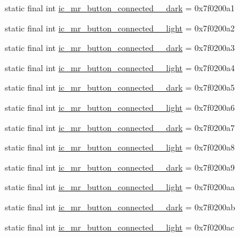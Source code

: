 \begin{CompactItemize}
\item 
static final int \hyperlink{classandroid_1_1support_1_1v7_1_1cardview_1_1_r_1_1drawable_36d4e7c06bec15ad7ebc860745ea773f}{ic\_\-mr\_\-button\_\-connected\_\_\-dark} = 0x7f0200a1
\item 
static final int \hyperlink{classandroid_1_1support_1_1v7_1_1cardview_1_1_r_1_1drawable_4e21ccc89b4e22bce84a042269f22503}{ic\_\-mr\_\-button\_\-connected\_\_\-light} = 0x7f0200a2
\item 
static final int \hyperlink{classandroid_1_1support_1_1v7_1_1cardview_1_1_r_1_1drawable_dae10b2248cdcb9e21725f2cdd05a508}{ic\_\-mr\_\-button\_\-connected\_\_\-dark} = 0x7f0200a3
\item 
static final int \hyperlink{classandroid_1_1support_1_1v7_1_1cardview_1_1_r_1_1drawable_91321fddb48432cad9e726a84f8b4fc0}{ic\_\-mr\_\-button\_\-connected\_\_\-light} = 0x7f0200a4
\item 
static final int \hyperlink{classandroid_1_1support_1_1v7_1_1cardview_1_1_r_1_1drawable_060ca2096b7bc826d40b7af7c21f631e}{ic\_\-mr\_\-button\_\-connected\_\_\-dark} = 0x7f0200a5
\item 
static final int \hyperlink{classandroid_1_1support_1_1v7_1_1cardview_1_1_r_1_1drawable_43e0c6d5ca18bd80a29a3fdca85ee1de}{ic\_\-mr\_\-button\_\-connected\_\_\-light} = 0x7f0200a6
\item 
static final int \hyperlink{classandroid_1_1support_1_1v7_1_1cardview_1_1_r_1_1drawable_fe9f1792a106c75b857658efe5c20920}{ic\_\-mr\_\-button\_\-connected\_\_\-dark} = 0x7f0200a7
\item 
static final int \hyperlink{classandroid_1_1support_1_1v7_1_1cardview_1_1_r_1_1drawable_7aa98b298d31e7c3962dd8dec65c042f}{ic\_\-mr\_\-button\_\-connected\_\_\-light} = 0x7f0200a8
\item 
static final int \hyperlink{classandroid_1_1support_1_1v7_1_1cardview_1_1_r_1_1drawable_d9dee2807abd86e437ecb61f2fa5879b}{ic\_\-mr\_\-button\_\-connected\_\_\-dark} = 0x7f0200a9
\item 
static final int \hyperlink{classandroid_1_1support_1_1v7_1_1cardview_1_1_r_1_1drawable_a66a6364fc5980cb0474681f5cdb5b95}{ic\_\-mr\_\-button\_\-connected\_\_\-light} = 0x7f0200aa
\item 
static final int \hyperlink{classandroid_1_1support_1_1v7_1_1cardview_1_1_r_1_1drawable_a4f3c7e4acdf4068e70e9da0090799a3}{ic\_\-mr\_\-button\_\-connected\_\_\-dark} = 0x7f0200ab
\item 
static final int \hyperlink{classandroid_1_1support_1_1v7_1_1cardview_1_1_r_1_1drawable_a8c5340b506bb89cd0e447ee4837d507}{ic\_\-mr\_\-button\_\-connected\_\_\-light} = 0x7f0200ac

\end{CompactItemize}
